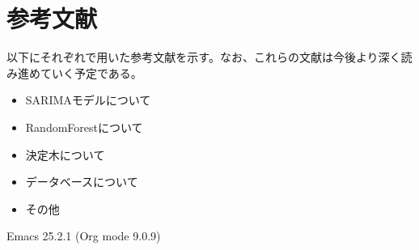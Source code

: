 \documentclass{scrartcl}
\begin{document}
\section{参考文献}
\label{sec:orgbef2431}
以下にそれぞれで用いた参考文献を示す。なお、これらの文献は今後より深く読み進めていく予定である。\\
\begin{itemize}
\item SARIMAモデルについて \cite{sarima01} \cite{sarima02} \cite{sarima03} \cite{sarima04} \cite{sarima05}\\
\item RandomForestについて \cite{rf01} \cite{rf02} \cite{rf03} \cite{rf04} \cite{rf05} \cite{rf06} \cite{rf07} \cite{Breiman:2001:RF:570181.570182} \cite{rf08} \cite{rf09}\\
\item 決定木について \cite{tree01}\\
\item データベースについて \cite{hbase01} \cite{hbase02} \cite{hbase03}\\
\item その他 \cite{bunpou01}\\
\end{itemize}

\printbibliography
Emacs 25.2.1 (Org mode 9.0.9)
\end{document}
